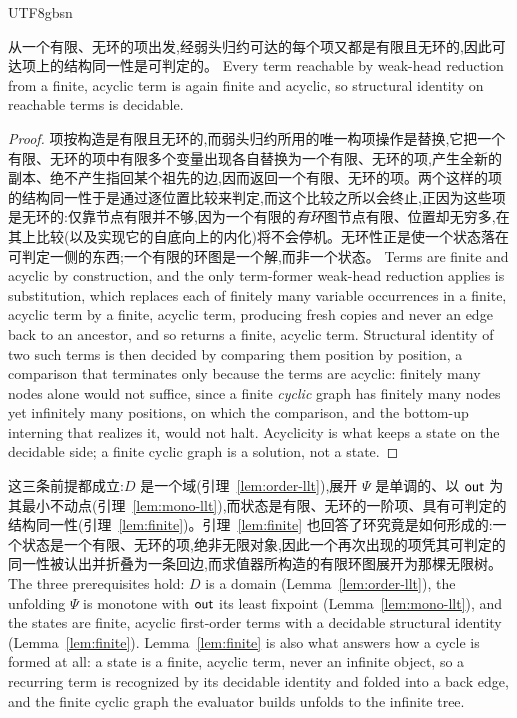 \begin{CJK*}{UTF8}{gbsn}
  \begin{lemma}\label{lem:finite}
    \ifTablambdaChinese
    从一个有限、无环的项出发,经弱头归约可达的每个项又都是有限且无环的,因此可达项上的结构同一性是可判定的。
    \else
    Every term reachable by weak-head reduction from a finite, acyclic term is again finite and acyclic, so structural identity on reachable terms is decidable.
    \fi
  \end{lemma}
  \begin{proof}
    \ifTablambdaChinese
    项按构造是有限且无环的,而弱头归约所用的唯一构项操作是替换,它把一个有限、无环的项中有限多个变量出现各自替换为一个有限、无环的项,产生全新的副本、绝不产生指回某个祖先的边,因而返回一个有限、无环的项。两个这样的项的结构同一性于是通过逐位置比较来判定,而这个比较之所以会终止,正因为这些项是无环的:仅靠节点有限并不够,因为一个有限的\emph{有环}图节点有限、位置却无穷多,在其上比较(以及实现它的自底向上的内化)将不会停机。无环性正是使一个状态落在可判定一侧的东西;一个有限的环图是一个解,而非一个状态。
    \else
    Terms are finite and acyclic by construction, and the only term-former weak-head reduction applies is substitution, which replaces each of finitely many variable occurrences in a finite, acyclic term by a finite, acyclic term, producing fresh copies and never an edge back to an ancestor, and so returns a finite, acyclic term. Structural identity of two such terms is then decided by comparing them position by position, a comparison that terminates only because the terms are acyclic: finitely many nodes alone would not suffice, since a finite \emph{cyclic} graph has finitely many nodes yet infinitely many positions, on which the comparison, and the bottom-up interning that realizes it, would not halt. Acyclicity is what keeps a state on the decidable side; a finite cyclic graph is a solution, not a state.
    \fi
  \end{proof}

  \noindent
  \ifTablambdaChinese
  这三条前提都成立:$D$ 是一个域(引理~\ref{lem:order-llt}),展开 $\Psi$ 是单调的、以 $\mathsf{out}$ 为其最小不动点(引理~\ref{lem:mono-llt}),而状态是有限、无环的一阶项、具有可判定的结构同一性(引理~\ref{lem:finite})。引理~\ref{lem:finite} 也回答了环究竟是如何形成的:一个状态是一个有限、无环的项,绝非无限对象,因此一个再次出现的项凭其可判定的同一性被认出并折叠为一条回边,而求值器所构造的有限环图展开为那棵无限树。
  \else
  The three prerequisites hold: $D$ is a domain (Lemma~\ref{lem:order-llt}), the unfolding $\Psi$ is monotone with $\mathsf{out}$ its least fixpoint (Lemma~\ref{lem:mono-llt}), and the states are finite, acyclic first-order terms with a decidable structural identity (Lemma~\ref{lem:finite}). Lemma~\ref{lem:finite} is also what answers how a cycle is formed at all: a state is a finite, acyclic term, never an infinite object, so a recurring term is recognized by its decidable identity and folded into a back edge, and the finite cyclic graph the evaluator builds unfolds to the infinite tree.
  \fi


\end{CJK*}
